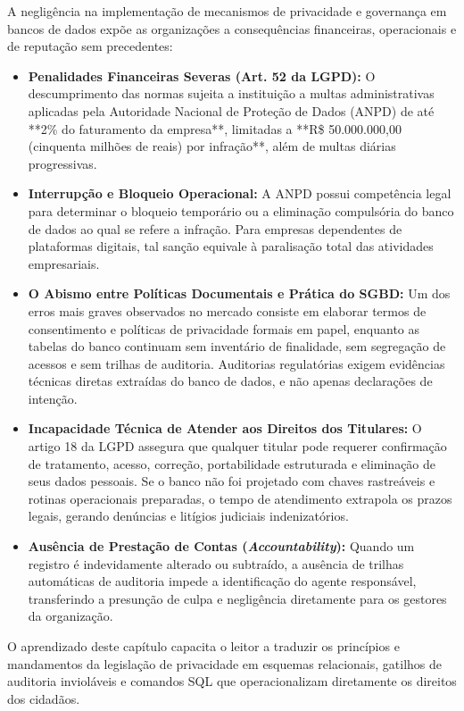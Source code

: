 A negligência na implementação de mecanismos de privacidade e governança em bancos de dados expõe as organizações a consequências financeiras, operacionais e de reputação sem precedentes:
\begin{itemize}
    \item \textbf{Penalidades Financeiras Severas (Art. 52 da LGPD):} O descumprimento das normas sujeita a instituição a multas administrativas aplicadas pela Autoridade Nacional de Proteção de Dados (ANPD) de até **2\% do faturamento da empresa**, limitadas a **R\$ 50.000.000,00 (cinquenta milhões de reais) por infração**, além de multas diárias progressivas.
    \item \textbf{Interrupção e Bloqueio Operacional:} A ANPD possui competência legal para determinar o bloqueio temporário ou a eliminação compulsória do banco de dados ao qual se refere a infração. Para empresas dependentes de plataformas digitais, tal sanção equivale à paralisação total das atividades empresariais.
    \item \textbf{O Abismo entre Políticas Documentais e Prática do SGBD:} Um dos erros mais graves observados no mercado consiste em elaborar termos de consentimento e políticas de privacidade formais em papel, enquanto as tabelas do banco continuam sem inventário de finalidade, sem segregação de acessos e sem trilhas de auditoria. Auditorias regulatórias exigem evidências técnicas diretas extraídas do banco de dados, e não apenas declarações de intenção.
    \item \textbf{Incapacidade Técnica de Atender aos Direitos dos Titulares:} O artigo 18 da LGPD assegura que qualquer titular pode requerer confirmação de tratamento, acesso, correção, portabilidade estruturada e eliminação de seus dados pessoais. Se o banco não foi projetado com chaves rastreáveis e rotinas operacionais preparadas, o tempo de atendimento extrapola os prazos legais, gerando denúncias e litígios judiciais indenizatórios.
    \item \textbf{Ausência de Prestação de Contas (\textit{Accountability}):} Quando um registro é indevidamente alterado ou subtraído, a ausência de trilhas automáticas de auditoria impede a identificação do agente responsável, transferindo a presunção de culpa e negligência diretamente para os gestores da organização.
\end{itemize}

O aprendizado deste capítulo capacita o leitor a traduzir os princípios e mandamentos da legislação de privacidade em esquemas relacionais, gatilhos de auditoria invioláveis e comandos SQL que operacionalizam diretamente os direitos dos cidadãos.

